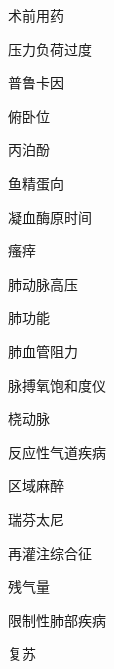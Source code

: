 \documentclass[10pt]{article}
\begin{document}
术前用药

压力负荷过度

普鲁卡因

俯卧位

丙泊酚

鱼精蛋向

凝血酶原时间

瘙㾕

肺动脉高压

肺功能

肺血管阻力

脉搏氧饱和度仪

桡动脉

反应性气道疾病

区域麻醉

瑞芬太尼

再灌注综合征

残气量

限制性肺部疾病

复苏
\end{document}
